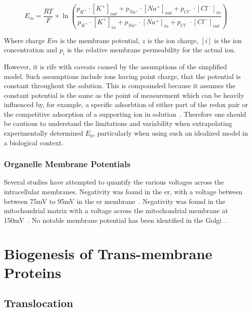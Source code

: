 \begin{equation}
{{E}_{m}}=\frac{RT}{F} \times{\ln}
  \left(\frac{
    {p}_{K^+}\cdot{[K^+]}_{out} + {p}_{Na^+}\cdot{[Na^+]}_{out} + {p}_{Cl^-}\cdot{[Cl^-]}_{in}}
    {{p}_{K^+}\cdot{[K^+]}_{in} + {p}_{Na^+}\cdot{[Na^+]}_{in} + {p}_{Cl^-}\cdot{[Cl^-]}_{out}
    }\right)
\end{equation}

Where charge $Em$ is the membrane potential, $z$ is the ion charge, $[i]$ is the ion concentration and ${p}_{i}$ is the relative membrane permeability for the actual ion.

However, it is rife with caveats caused by the assumptions of the simplified model. Such assumptions include ions having point charge, that the potential is constant throughout the solution. This is compounded because it assumes the constant potential is the same as the point of measurement which can be heavily influenced by, for example, a specific adsorbtion of either part of the redox pair or the competitive adsorption of a supporting ion in solution~\cite{Feiner1994}. Therefore one should be cautious to understand the limitations and variability when extrapolating experimentally determined ${E}_{0}$, particularly when using such an idealized model in a biological context.

\subsubsection{Organelle Membrane Potentials}

Several studies have attempted to quantify the various voltages across the intracellular membranes. Negativity was found in the \gls{er}, with a voltage between between 75mV to 95mV in the \gls{er} membrane~\cite{Qin2011, Worley1994}. Negativity was found in the mitochondrial matrix with a  voltage across the mitochondrial membrane at 150mV~\cite{Perry2011}. No notable membrane potential has been identified in the Golgi~\cite{Schapiro2000, Llopis1998}.

\section{Biogenesis of Trans-membrane Proteins}
\subsection{Translocation}


